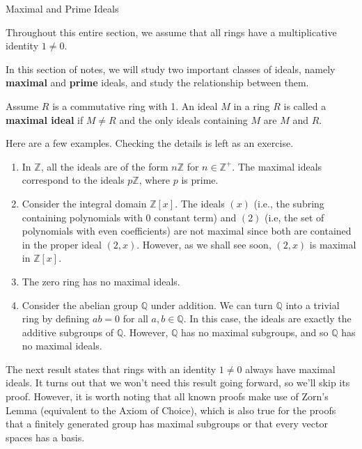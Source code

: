 \begin{section}{Maximal and Prime Ideals}

Throughout this entire section, we assume that all rings have a multiplicative identity $1\neq 0$.

In this section of notes, we will study two important classes of ideals, namely \textbf{maximal} and \textbf{prime} ideals, and study the relationship between them. 

\begin{definition}
Assume $R$ is a commutative ring with 1. An ideal $M$ in a ring $R$ is called a \textbf{maximal ideal} if $M\neq R$ and the only ideals containing $M$ are $M$ and $R$.
\end{definition}

\begin{example}
Here are a few examples.  Checking the details is left as an exercise.
\begin{enumerate}[label=\rm{(\alph*)}]
\item In $\mathbb{Z}$, all the ideals are of the form $n\mathbb{Z}$ for $n\in\mathbb{Z}^+$.  The maximal ideals correspond to the ideals $p\mathbb{Z}$, where $p$ is prime.
\item Consider the integral domain $\mathbb{Z}[x]$.  The ideals $(x)$ (i.e., the subring containing polynomials with 0 constant term) and $(2)$ (i.e, the set of polynomials with even coefficients) are not maximal since both are contained in the proper ideal $(2,x)$.  However, as we shall see soon, $(2,x)$ is maximal in $\mathbb{Z}[x]$.
\item The zero ring has no maximal ideals.
\item Consider the abelian group $\mathbb{Q}$ under addition.  We can turn $\mathbb{Q}$ into a trivial ring by defining $ab=0$ for all $a,b\in\mathbb{Q}$.  In this case, the ideals are exactly the additive subgroups of $\mathbb{Q}$.  However, $\mathbb{Q}$ has no maximal subgroups, and so $\mathbb{Q}$ has no maximal ideals.
\end{enumerate}
\end{example}

The next result states that rings with an identity $1\neq 0$ always have maximal ideals.  It turns out that we won't need this result going forward, so we'll skip its proof.  However, it is worth noting that all known proofs make use of Zorn's Lemma (equivalent to the Axiom of Choice), which is also true for the proofs that a finitely generated group has maximal subgroups or that every vector spaces has a basis.


\end{section}
